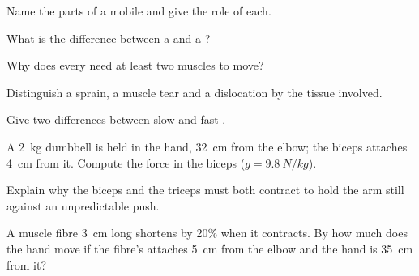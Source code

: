 \begin{exercise}[$\star$]\label{exo:g10:muscles-and-joints:1}
Name the parts of a mobile  and give the role of each.
\end{exercise}

\begin{exercise}[$\star$]\label{exo:g10:muscles-and-joints:2}
What is the difference between a  and a ?
\end{exercise}

\begin{exercise}[$\star$]\label{exo:g10:muscles-and-joints:3}
Why does every  need at least two muscles to move?
\end{exercise}

\begin{exercise}[$\star$]\label{exo:g10:muscles-and-joints:4}
Distinguish a sprain, a muscle tear and a dislocation by the tissue
involved.
\end{exercise}

\begin{exercise}[$\star$]\label{exo:g10:muscles-and-joints:5}
Give two differences between slow and fast .
\end{exercise}

\begin{exercise}[$\star\star$]\label{exo:g10:muscles-and-joints:6}
A \qty{2}{kg} dumbbell is held in the hand, \qty{32}{cm} from the
elbow; the biceps attaches \qty{4}{cm} from it. Compute the force in
the biceps ($g = \qty{9.8}{N/kg}$).
\end{exercise}

\begin{exercise}[$\star\star$]\label{exo:g10:muscles-and-joints:7}
Explain why the biceps and the triceps must both contract to hold the
arm still against an unpredictable push.
\end{exercise}

\begin{exercise}[$\star\star$]\label{exo:g10:muscles-and-joints:8}
A muscle fibre \qty{3}{cm} long shortens by 20\% when it contracts.
By how much does the hand move if the fibre's  attaches
\qty{5}{cm} from the elbow and the hand is \qty{35}{cm} from it?
\end{exercise}

